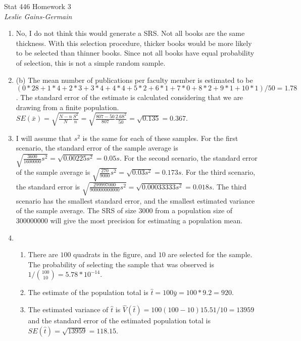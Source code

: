 \documentclass[11pt]{article}
\begin{document}
\begin{flushleft}
{\sc \Large Stat 446 Homework 3 } \hfill \\
\bigskip
{\it Leslie Gains-Germain}
\end{flushleft}

\begin{doublespace}


\begin{enumerate}

\item No, I do not think this would generate a SRS. Not all books are the same thickness. With this selection procedure, thicker books would be more likely to be selected than thinner books. Since not all books have equal probability of selection, this is not a simple random sample.

\item (b) The mean number of publications per faculty member is estimated to be $(0*28+1*4+2*3+3*4+4*4+5*2+6*1+7*0+8*2+9*1+10*1)/50 = 1.78$. The standard error of the estimate is calculated considering that we are drawing from a finite population. $SE(\bar{x})=\sqrt{\frac{N-n}{N}\frac{S^2}{n}} = \sqrt{\frac{807-50}{807}\frac{2.68^2}{50}}=\sqrt{0.135}=0.367$.

\item I will assume that $s^2$ is the same for each of these samples. For the first scenario, the standard error of the sample average is $\sqrt{\frac{3600}{1600000}s^2}=\sqrt{0.00225s^2}=0.05s$. For the second scenario, the standard error of the sample average is $\sqrt{\frac{270}{9000}s^2}=\sqrt{0.03s^2}=0.173s$. For the third scenario, the standard error is $\sqrt{\frac{299997000}{900000000000}s^2}=\sqrt{0.00033333s^2}=0.018s$. The third scenario has the smallest standard error, and the smallest estimated variance of the sample average. The SRS of size $3000$ from a population size of $300000000$ will give the most precision for estimating a population mean.

\item \begin{enumerate}
\item There are $100$ quadrats in the figure, and $10$ are selected for the sample. The probability of selecting the sample that was observed is $1/{100 \choose 10} = 5.78*10^{-14}$.

\item The estimate of the population total is $\hat{t}=100\bar{y}=100*9.2=920$.

\item The estimated variance of $\hat{t}$ is $\hat{V}(\hat{t})=100(100-10)15.51/10=13959$ and the standard error of the estimated population total is $SE(\hat{t})=\sqrt{13959}=118.15$.


\end{enumerate}
\end{enumerate}
\end{doublespace}
\end{document}
